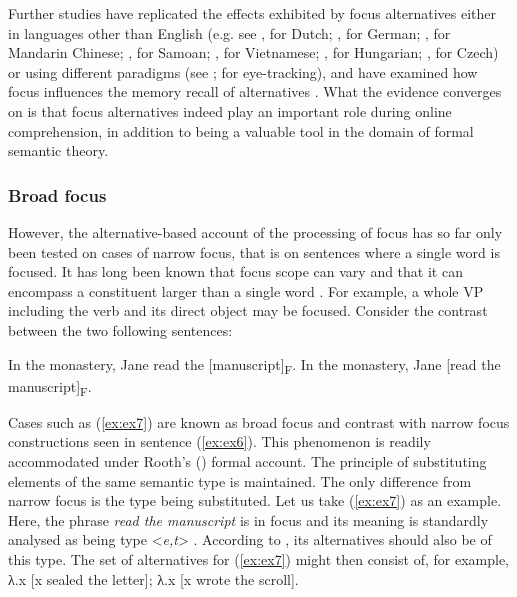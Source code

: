 \documentclass[output=paper,colorlinks,citecolor=brown]{langscibook}
\begin{document}
Further studies have replicated the effects exhibited by focus alternatives either in languages other than English (e.g. see \citealt{braun2010role}, for Dutch; \citealt{jordens2020role}, for German; \citealt{yan2019priming,yan2022role}, for Mandarin Chinese; \citealt{Calhoun_et_al_2022}, for Samoan; \citealt{tjuka2020foxes}, for Vietnamese; \citealt{kaldi2021hungarian}, for Hungarian; \citealt{Lacina_Czech_2023}, for Czech) or using different paradigms (see \citealt{kim2015context}; \citealt{braun2019not} for eye-tracking), and have examined how focus influences the memory recall of alternatives \citep{fraundorf2010recognition,lee2017effects,norberg2021memory}. What the evidence converges on is that focus alternatives indeed play an important role during online comprehension, in addition to being a valuable tool in the domain of formal semantic theory.

\subsubsection{Broad focus}
However, the alternative-based account of the processing of focus has so far only been tested on cases of narrow focus, that is on sentences where a single word is focused. It has long been known that focus scope can vary and that it can encompass a constituent larger than a single word \citep{selkirk1995sentence,gussenhoven1999discreteness,erteschik2007information}. For example, a whole VP including the verb and its direct object may be focused. Consider the contrast between the two following sentences:

\ea\label{ex:ex6} In the monastery, Jane read the [manuscript]\textsubscript{F}.
\ex\label{ex:ex7} In the monastery, Jane [read the manuscript]\textsubscript{F}.
\z

Cases such as (\ref{ex:ex7}) are known as broad focus and contrast with narrow focus constructions seen in sentence (\ref{ex:ex6}). This phenomenon is readily accommodated under Rooth's (\citeyear{rooth1992}) formal account. The principle of substituting elements of the same semantic type is maintained. The only difference from narrow focus is the type being substituted. Let us take (\ref{ex:ex7}) as an example. Here, the phrase \textit{read the manuscript} is in focus and its meaning is standardly analysed as being type <\textit{e,t}> \citep{kratzer1998semantics}. According to \citet{rooth1992}, its alternatives should also be of this type. The set of alternatives for (\ref{ex:ex7}) might then consist of, for example, {λ.x [x sealed the letter]; λ.x [x wrote the scroll]}.
\end{document}
